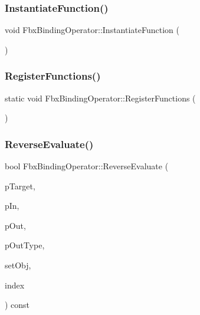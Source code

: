 \mbox{\label{class_fbx_binding_operator_aba1f55d1c5458713779fc2bdfc272b3e}} 
\subsubsection{\texorpdfstring{Instantiate\+Function()}{InstantiateFunction()}}
{\footnotesize\ttfamily void Fbx\+Binding\+Operator\+::\+Instantiate\+Function (\begin{DoxyParamCaption}{ }\end{DoxyParamCaption})\hspace{0.3cm}{\ttfamily [protected]}}

\mbox{\label{class_fbx_binding_operator_a228cdd04bfe2e075533f2af0db26ea91}} 
\subsubsection{\texorpdfstring{Register\+Functions()}{RegisterFunctions()}}
{\footnotesize\ttfamily static void Fbx\+Binding\+Operator\+::\+Register\+Functions (\begin{DoxyParamCaption}{ }\end{DoxyParamCaption})\hspace{0.3cm}{\ttfamily [static]}}

\mbox{\label{class_fbx_binding_operator_a7528f0c6f942433c0c5c78fc5e803bbc}} 
\subsubsection{\texorpdfstring{Reverse\+Evaluate()}{ReverseEvaluate()}}
{\footnotesize\ttfamily bool Fbx\+Binding\+Operator\+::\+Reverse\+Evaluate (\begin{DoxyParamCaption}\item[{const \hyperlink{class_fbx_object}{Fbx\+Object} $\ast$}]{p\+Target,  }\item[{const void $\ast$}]{p\+In,  }\item[{void $\ast$$\ast$}]{p\+Out,  }\item[{\hyperlink{fbxpropertytypes_8h_a73913a5ddfb20e57c6f25e9e6784bd92}{E\+Fbx\+Type} $\ast$}]{p\+Out\+Type,  }\item[{bool}]{set\+Obj,  }\item[{int}]{index }\end{DoxyParamCaption}) const\hspace{0.3cm}{\ttfamily [protected]}}

